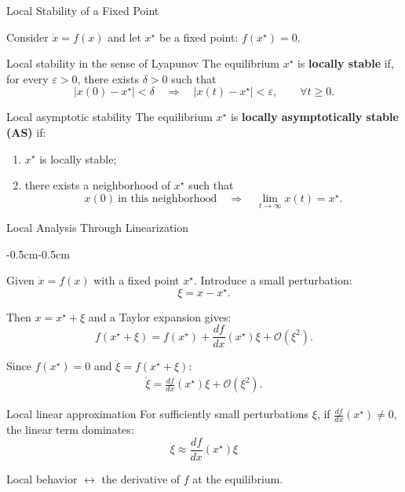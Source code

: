\documentclass{beamer}
\begin{document}
\begin{frame}{Local Stability of a Fixed Point}
	\begin{flushleft}
	
	Consider $\dot{x}=f(x)$  and let \(x^\star\) be a fixed point: $f(x^\star)=0$.
	
	\begin{block}{Local stability in the sense of Lyapunov}
		The equilibrium \(x^\star\) is \textbf{locally stable} if, for every
		\(\varepsilon>0\), there exists \(\delta>0\) such that
		\[
		|x(0)-x^\star|<\delta
		\quad\Longrightarrow\quad
		|x(t)-x^\star|<\varepsilon,
		\qquad \forall t\geq 0.
		\]
	\end{block}
	
	\vspace{0.2cm}
	
	\begin{block}{Local asymptotic stability}
		The equilibrium \(x^\star\) is \textbf{locally asymptotically stable (AS)}
		if:
		
		\begin{enumerate}
			\item \(x^\star\) is locally stable;
			\item there exists a neighborhood of \(x^\star\) such that
			\[
			x(0)\ \text{in this neighborhood}
			\quad\Longrightarrow\quad
			\lim_{t\to\infty}x(t)=x^\star.
			\]
		\end{enumerate}
	\end{block}
	
\end{flushleft}
\end{frame}




\begin{frame}{Local Analysis Through Linearization}
	\begin{flushleft}
	\begin{adjustwidth}{-0.5cm}{-0.5cm}
		
	Given $\dot{x}=f(x)$ with a fixed point \(x^\star\). Introduce a small perturbation:
	\[
	\xi = x-x^\star.
	\]
	
	Then $x=x^\star+\xi$ and a Taylor expansion gives:
	\[
	f(x^\star+\xi)
	=
	f(x^\star)
	+
	\frac{df}{dx}(x^\star)\xi
	+
	\mathcal{O}(\xi^2).
	\]
	
	Since \(f(x^\star)=0\) and $\dot{\xi} = f(x^\star+\xi)$:
	\begin{align*}
	\dot{\xi}
	=
	\frac{df}{dx}(x^\star)\xi
	+
	\mathcal{O}(\xi^2).
	\end{align*}
	\vspace{-0.9em}
	\begin{block}{Local linear approximation}
		For sufficiently small perturbations \(\xi\), if $\frac{df}{dx}(x^\star)\neq 0$, the linear term dominates:
		\[
			\dot{\xi}
			\approx
			\frac{df}{dx}(x^\star)\xi
		\]
	\end{block}
	
	Local behavior $\leftrightarrow$  the derivative of	\(f\) at the equilibrium.
	
	\end{adjustwidth}
\end{flushleft}
\end{frame}
\end{document}
